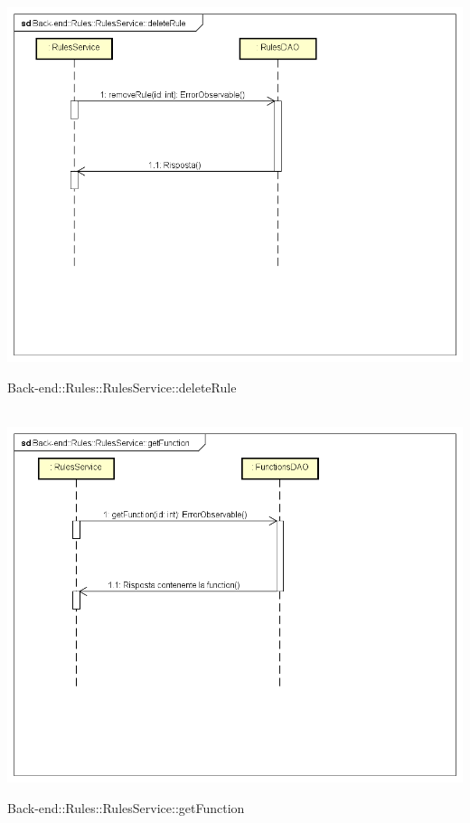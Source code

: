 \\ \includegraphics[width=\textwidth,height=\textheight,keepaspectratio]{images/diagrams/back-end/Ufficial_Backend/Back-end__Rules__RulesService__deleteRule.png} 	\caption{Back-end::Rules::RulesService::deleteRule}
\\ \includegraphics[width=\textwidth,height=\textheight,keepaspectratio]{images/diagrams/back-end/Ufficial_Backend/Back-end__Rules__RulesService__getFunction.png} 	\caption{Back-end::Rules::RulesService::getFunction}
